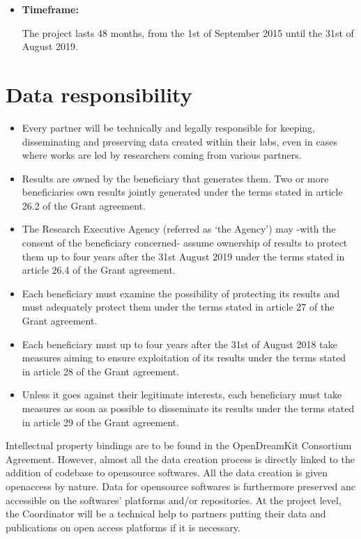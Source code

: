 \documentclass{../../Proposal/LaTeX-proposal/deliverablereport}
\begin{document}
\newpage
\begin{itemize} 
\item\textbf{Timeframe:}

The project lasts 48 months, from the 1st of September 2015 until the 31st of August 2019.
\end{itemize}

\section{Data responsibility}

\begin{itemize}
\item{}Every partner will be technically and legally responsible for keeping, disseminating and preserving data created within their labs, even in cases where works are led by researchers coming from various partners.
\item{}Results are owned by the beneficiary that generates them. Two or more beneficiaries own results jointly generated under the terms stated in article 26.2 of the Grant agreement.
\item{}The Research Executive Agency (referred as ‘the Agency’) may -with the consent of the beneficiary concerned- assume ownership of results to protect them up to four years after the 31st August 2019 under the terms stated in article 26.4 of the Grant agreement.
\item{}Each beneficiary must examine the possibility of protecting its results and must adequately protect them under the terms stated in article 27 of the Grant agreement.
\item{}Each beneficiary must up to four years after the 31st of August 2018 take measures aiming to ensure exploitation of its results under the terms stated in article 28 of the Grant agreement.
\item{}Unless it goes against their legitimate interests, each beneficiary must take measures as soon as possible to disseminate its results under the terms stated in article 29 of the Grant agreement.
\end{itemize}
 

Intellectual property bindings are to be found in the OpenDreamKit Consortium Agreement.
However, almost all the data creation process is directly linked to the addition of  codebase to opensource softwares. All the data creation is given openaccess by nature. Data for opensource softwares is furthermore preserved anc accessible on the softwares' platforms and/or repositories.
At the project level, the Coordinator will be a technical help to partners putting their data and publications on open access platforms if it is necessary.
\end{document}
